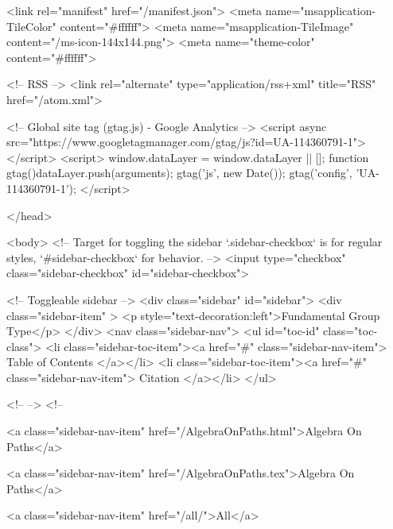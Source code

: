   <link rel="manifest" href="/manifest.json">
  <meta name="msapplication-TileColor" content="#ffffff">
  <meta name="msapplication-TileImage" content="/ms-icon-144x144.png">
  <meta name="theme-color" content="#ffffff">
  
  <!-- RSS -->
  <link rel="alternate" type="application/rss+xml" title="RSS" href="/atom.xml">

  <!-- Global site tag (gtag.js) - Google Analytics -->
  <script async src="https://www.googletagmanager.com/gtag/js?id=UA-114360791-1"></script>
  <script>
    window.dataLayer = window.dataLayer || [];
    function gtag(){dataLayer.push(arguments);}
    gtag('js', new Date());
    gtag('config', 'UA-114360791-1');
  </script>

  
</head>




  <body>
    <!-- Target for toggling the sidebar `.sidebar-checkbox` is for regular
     styles, `#sidebar-checkbox` for behavior. -->
<input type="checkbox" class="sidebar-checkbox" id="sidebar-checkbox">

<!-- Toggleable sidebar -->
<div class="sidebar" id="sidebar">
  <div class="sidebar-item" >
    <p style="text-decoration:left">Fundamental Group Type</p>
  </div>
  <nav class="sidebar-nav">
    <ul id="toc-id" class="toc-class">
  <li class="sidebar-toc-item"><a href="#" class="sidebar-nav-item"> Table of Contents </a></li>
  <li class="sidebar-toc-item"><a href="#" class="sidebar-nav-item"> Citation </a></li>
</ul>


    <!--  -->
    <!-- 
      
    
      
    
      
    
      
        
      
    
      
        
          <a class="sidebar-nav-item" href="/AlgebraOnPaths.html">Algebra On Paths</a>
        
      
    
      
        
          <a class="sidebar-nav-item" href="/AlgebraOnPaths.tex">Algebra On Paths</a>
        
      
    
      
        
          <a class="sidebar-nav-item" href="/all/">All</a>
        
      
    
      
        
